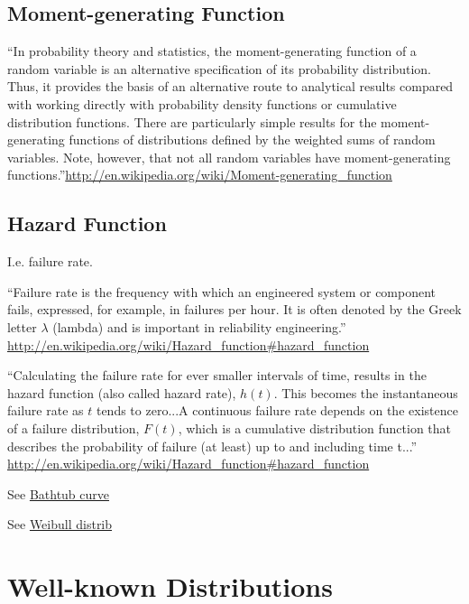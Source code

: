 \section{Moment-generating Function}

``In probability theory and statistics, the moment-generating function of a random variable is an alternative specification of its probability distribution. Thus, it provides the basis of an alternative route to analytical results compared with working directly with probability density functions or cumulative distribution functions. There are particularly simple results for the moment-generating functions of distributions defined by the weighted sums of random variables. Note, however, that not all random variables have moment-generating functions.''\url{http://en.wikipedia.org/wiki/Moment-generating_function}

\section{Hazard Function}

I.e. failure rate.

``Failure rate is the frequency with which an engineered system or
component fails, expressed, for example, in failures per hour. It is
often denoted by the Greek letter $\lambda$ (lambda) and is important in
reliability engineering.''
\url{http://en.wikipedia.org/wiki/Hazard_function#hazard_function}

``Calculating the failure rate for ever smaller intervals of time,
results in the hazard function (also called hazard rate), $h(t)$. This
becomes the instantaneous failure rate as $t$ tends
to zero...A continuous failure rate depends on the existence of a
failure distribution, $F(t)$, which is a cumulative
distribution function that describes the probability of failure (at
least) up to and including time t...''
\url{http://en.wikipedia.org/wiki/Hazard_function#hazard_function}

See \href{http://en.wikipedia.org/wiki/Bathtub_curve}{Bathtub curve}

See \href{http://en.wikipedia.org/wiki/Weibull_chart}{Weibull distrib}

\chapter{Well-known Distributions}

